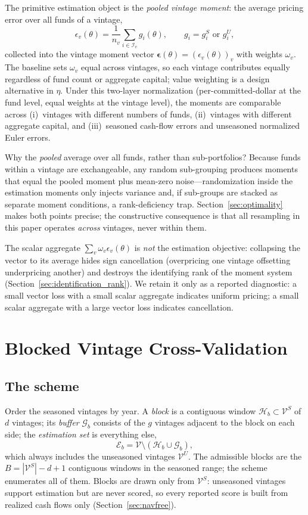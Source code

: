 \documentclass[11pt]{article}
\begin{document}
The primitive estimation object is the \emph{pooled vintage moment}: the average pricing error over all funds of a vintage,
\[
\epsilon_v(\theta)
=
\frac{1}{n_v}\sum_{i\in\mathcal I_v} g_i(\theta),
\qquad
g_i=g_i^S \text{ or } g_i^U,
\]
collected into the vintage moment vector \(\boldsymbol\epsilon(\theta)=(\epsilon_v(\theta))_v\) with weights \(\omega_v\). The baseline sets \(\omega_v\) equal across vintages, so each vintage contributes equally regardless of fund count or aggregate capital; value weighting is a design alternative in \(\eta\). Under this two-layer normalization (per-committed-dollar at the fund level, equal weights at the vintage level), the moments are comparable across (i)~vintages with different numbers of funds, (ii)~vintages with different aggregate capital, and (iii)~seasoned cash-flow errors and unseasoned normalized Euler errors.

Why the \emph{pooled} average over all funds, rather than sub-portfolios? Because funds within a vintage are exchangeable, any random sub-grouping produces moments that equal the pooled moment plus mean-zero noise---randomization inside the estimation moments only injects variance and, if sub-groups are stacked as separate moment conditions, a rank-deficiency trap. Section~\ref{sec:optimality} makes both points precise; the constructive consequence is that all resampling in this paper operates \emph{across} vintages, never within them.

The scalar aggregate \(\sum_v\omega_v\epsilon_v(\theta)\) is \emph{not} the estimation objective: collapsing the vector to its average hides sign cancellation (overpricing one vintage offsetting underpricing another) and destroys the identifying rank of the moment system (Section~\ref{sec:identification_rank}). We retain it only as a reported diagnostic: a small vector loss with a small scalar aggregate indicates uniform pricing; a small scalar aggregate with a large vector loss indicates cancellation.

\section{Blocked Vintage Cross-Validation}
\label{sec:scheme}

\subsection{The scheme}
\label{sec:blocks}

Order the seasoned vintages by year. A \emph{block} is a contiguous window \(\mathcal H_b\subset\mathcal V^S\) of \(d\) vintages; its \emph{buffer} \(\mathcal G_b\) consists of the \(g\) vintages adjacent to the block on each side; the \emph{estimation set} is everything else,
\[
\mathcal E_b=\mathcal V\setminus(\mathcal H_b\cup\mathcal G_b),
\]
which always includes the unseasoned vintages \(\mathcal V^U\). The admissible blocks are the \(B=|\mathcal V^S|-d+1\) contiguous windows in the seasoned range; the scheme enumerates all of them. Blocks are drawn only from \(\mathcal V^S\): unseasoned vintages support estimation but are never scored, so every reported score is built from realized cash flows only (Section~\ref{sec:navfree}).
\end{document}
